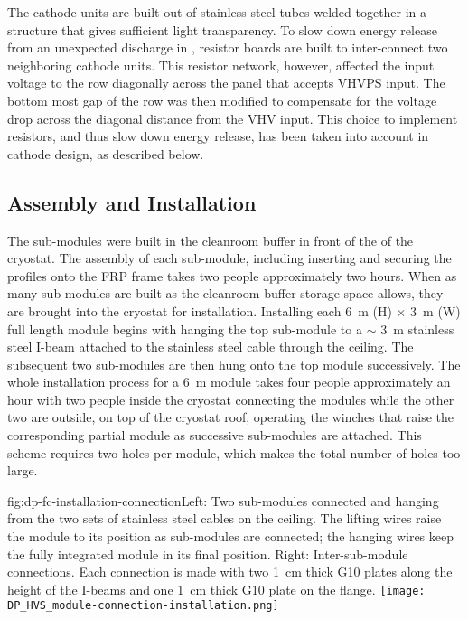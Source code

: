 The cathode units are built out of stainless steel tubes welded together in a structure that gives sufficient light transparency.
To slow down energy release from an unexpected discharge in , resistor boards are built to inter-connect two neighboring cathode units.
This resistor network, however, affected the input voltage to the  row diagonally across the  panel that accepts VHVPS input. The bottom most gap of the  row was then modified to compensate for the voltage drop across the diagonal distance from the VHV input.
This choice to implement resistors, and thus slow down energy release, has been taken into account in  \dual cathode design, as described below.

\subsection{Assembly and Installation}
\label{sec:fddp-hv-protodune-lessons-assy}
The  sub-modules were built in the cleanroom buffer in front of the  of the  cryostat.
The assembly of each sub-module, including inserting and securing the profiles onto the FRP frame takes two people approximately two hours.
When as many sub-modules are built as the cleanroom buffer storage space allows, they are brought into the cryostat for installation.
Installing each \SI{6}{\m} (H) $\times$ \SI{3}{\m} (W) full length module begins with hanging the top sub-module to a $\sim$ \SI{3}{\m} stainless steel I-beam attached to the stainless steel cable through the ceiling.
The subsequent two sub-modules are then hung onto the top module successively.
The whole installation process for a \SI{6}{\m} module takes four people approximately an hour with
two people inside the cryostat connecting the modules while the other two are outside, on top of the cryostat roof, operating the winches that raise the corresponding partial module as successive sub-modules are attached.
This scheme requires two \fdth holes per module, which makes the total number of \fdth holes too large.

\begin{dunefigure}{fig:dp-fc-installation-connection}{Left: Two sub-modules connected and hanging from the two sets of stainless steel cables on the ceiling.  The lifting wires raise the module to its position as sub-modules are connected; the hanging wires keep the fully integrated module in its final position.  Right: Inter-sub-module connections.  Each connection is made with two \SI{1}{cm} thick G10 plates along the height of the I-beams and one \SI{1}{cm} thick G10 plate on the flange.}
\texttt{[image: DP\_HVS\_module-connection-installation.png]}
\end{dunefigure}

